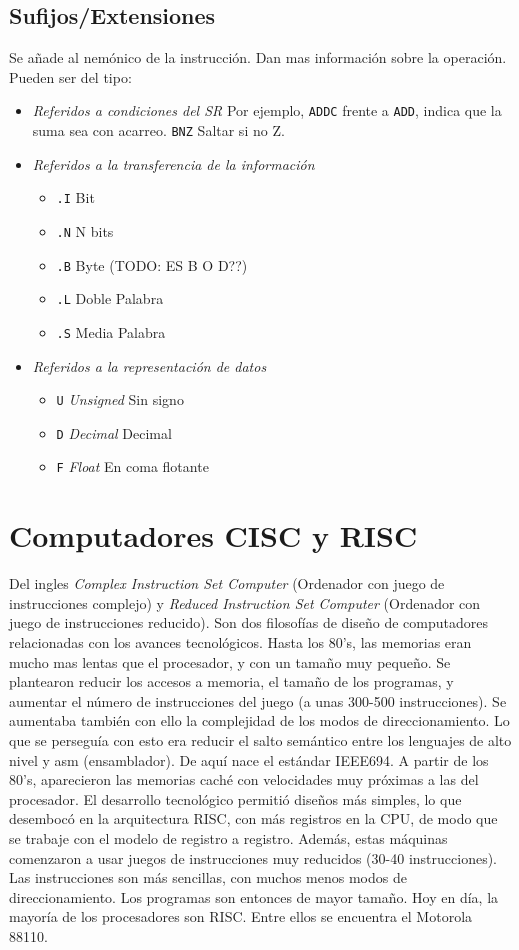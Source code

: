 \documentclass[a4paper,11pt,spanish]{report}
\begin{document}
\subsection{Sufijos/Extensiones}
Se añade al nemónico de la instrucción. Dan mas información sobre la operación. Pueden ser del tipo:
\begin{itemize}
\item \emph{Referidos a condiciones del SR} Por ejemplo, \verb|ADDC| frente a \verb|ADD|, indica que la suma sea con acarreo. \verb|BNZ| Saltar si no Z.
\item \emph{Referidos a la transferencia de la información}
\begin{itemize}
\item \verb|.I| \textrightarrow Bit
\item \verb|.N| \textrightarrow N bits
\item \verb|.B| \textrightarrow Byte  (TODO: ES B O D??)
\item \verb|.L| \textrightarrow Doble Palabra
\item \verb|.S| \textrightarrow Media Palabra
\end{itemize}
\item \emph{Referidos a la representación de datos}
\begin{itemize}
\item \verb|U| \textrightarrow \emph{Unsigned} Sin signo
\item \verb|D| \textrightarrow \emph{Decimal} Decimal
\item \verb|F| \textrightarrow \emph{Float} En coma flotante
\end{itemize}
\end{itemize}
\section{Computadores CISC y RISC}
Del ingles \emph{Complex Instruction Set Computer} (Ordenador con juego de instrucciones complejo) y \emph{Reduced Instruction Set Computer} (Ordenador con juego de instrucciones reducido).
Son dos filosofías de diseño de computadores relacionadas con los avances tecnológicos. Hasta los 80's, las memorias eran mucho mas lentas que el procesador, y con un tamaño muy pequeño. Se plantearon reducir los accesos a memoria, el tamaño de los programas, y aumentar el número de instrucciones del juego (a unas 300-500 instrucciones). 
Se aumentaba también con ello la complejidad de los modos de direccionamiento. Lo que se perseguía con esto era reducir el salto semántico entre los lenguajes de alto nivel y asm (ensamblador). De aquí nace el estándar IEEE694.
A partir de los 80's, aparecieron las memorias caché con velocidades muy próximas a las del procesador. El desarrollo tecnológico permitió diseños más simples, lo que desembocó en la arquitectura RISC, con más registros en la CPU, de modo que se trabaje con el modelo de registro a registro. Además, estas máquinas comenzaron a usar juegos de instrucciones muy reducidos (30-40 instrucciones). Las instrucciones son más sencillas, con muchos menos modos de direccionamiento. Los programas son entonces de mayor tamaño. Hoy en día, la mayoría de los procesadores son RISC. Entre ellos se encuentra el Motorola 88110.
\end{document}
